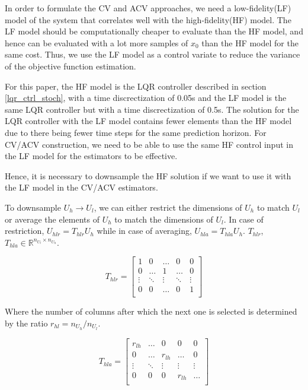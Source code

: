 \documentclass{article}
\begin{document}
In order to formulate the CV and ACV approaches, we need a low-fidelity(LF) model of the system that correlates well
with the high-fidelity(HF) model. The LF model should be computationally cheaper to evaluate than the
HF model, and hence can be evaluated with a lot more samples of $x_0$ than the HF model for the same cost.
Thus, we use the LF model as a control variate to reduce the variance of the objective function
estimation.

For this paper, the HF model is the LQR controller described in section \ref{lqr_ctrl_stoch}, with a time
discrectization of 0.05s and the LF model is the same LQR controller but with a time discrectization of 0.5s.
The solution for the LQR controller with the LF model contains fewer elements than the HF model due to there being
fewer time steps for the same prediction horizon. For CV/ACV construction, we need to be able to use the same
HF control input in the LF model for the estimators to be effective.

Hence, it is necessary to downsample the HF solution if we want to use it with the LF model in the CV/ACV estimators.

To downsample $U_h \rightarrow U_l$, we can either restrict the dimensions of $U_h$ to match $U_l$ or average the elements of $U_h$ to match the dimensions of $U_l$.
In case of restriction, $U_{hlr} = T_{hlr} U_h$ while in case of averaging, $U_{hla} = T_{hla} U_h$.
$T_{hlr}$, $T_{hla} \in \mathbb{R}^{n_{U_l} \times n_{U_h}}$.

$$
T_{hlr} =
\begin{bmatrix}
  1 & 0 & \ldots & 0 & 0 \\
  0 & \ldots & 1 & \ldots & 0 \\
  \vdots & \ddots & \vdots & \ddots & \vdots \\
  0 & 0 & \ldots & 0 & 1 \\
\end{bmatrix}
$$

Where the number of columns after which the next one is selected is determined by the ratio $r_{hl} = n_{U_h} / n_{U_l}$.

$$
T_{hla} =
\begin{bmatrix}
  r_{lh} & \ldots & 0 & 0 & 0 \\
  0 & \ldots & r_{lh} & \ldots & 0 \\
  \vdots & \ddots & \vdots & \vdots & \vdots \\
  0 & 0 & 0 & r_{lh} & \ldots \\
\end{bmatrix}
$$
\end{document}
